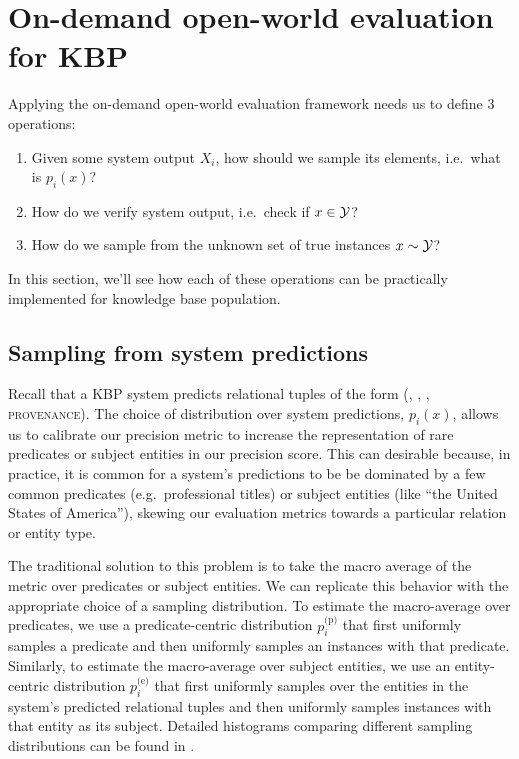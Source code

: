 \section{On-demand open-world evaluation for KBP}
\label{sec:application}
Applying the on-demand open-world evaluation framework needs us to define 3 operations:
\begin{enumerate}
  \item Given some system output $X_i$, how should we sample its elements, i.e.\ what is $p_i(x)$?
  \item How do we verify system output, i.e.\ check if $x \in \mathcal{Y}$?
  \item How do we sample from the unknown set of true instances $x \sim \mathcal{Y}$?
\end{enumerate}
In this section, we'll see how each of these operations can be practically implemented for knowledge base population.

\subsection{Sampling from system predictions}
Recall that a KBP system predicts relational tuples of the form (, , , \textsc{provenance}).
The choice of distribution over system predictions, $p_i(x)$, allows us to calibrate our precision metric to increase the representation of rare predicates or subject entities in our precision score.
This can desirable because, in practice, it is common for a system's predictions to be be dominated by a few common predicates (e.g.\ professional titles) or subject entities (like ``the United States of America''), skewing our evaluation metrics towards a particular relation or entity type.

The traditional solution to this problem is to take the macro average of the metric over predicates or subject entities.
We can replicate this behavior with the appropriate choice of a sampling distribution.
To estimate the macro-average over predicates, we use a predicate-centric distribution $p_i^\text{(p)}$ that first uniformly samples a predicate and then uniformly samples an instances with that predicate.
Similarly, to estimate the macro-average over subject entities, we use an entity-centric distribution $p_i^\text{(e)}$ that first uniformly samples over the entities in the system's predicted relational tuples and then uniformly samples instances with that entity as its subject.
Detailed histograms comparing different sampling distributions can be found in .

